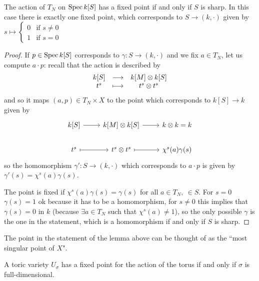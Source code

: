 \begin{lemma}[]\label{LmFixedPointForActionOfTorusInAffine}
The action of $T_N$ on $\operatorname{Spec} k[S]$ has a fixed point if and only if $S$ is sharp.
In this case there is exactly one fixed point, which corresponds to $S\to (k,\cdot)$ given by $s\mapsto \begin{cases}
	0&\text{if }s\neq 0\\
	1&\text{if }s=0
\end{cases}$
\end{lemma}
\begin{proof}
If $p\in \operatorname{Spec} k[S]$ corresponds to $\gamma:S\to (k,\cdot)$ and we fix $a\in T_N$, let us compute $a\cdot p$: recall that the action is described by
\[\begin{array}{ccc} {k[S]} & \longrightarrow & {k[M]\otimes k[S]}\\ {t^s} & \longmapsto & {t^s\otimes t^s} \end{array}\]
and so it maps $(a,p)\in T_N\times X$ to the point which corresponds to $k[S]\to k$ given by
\[\begin{tikzcd}
	{k[S]} & {k[M]\otimes k[S]} & {k\otimes k=k} \\
	{t^s} & {t^s\otimes t^s} & {\chi^s(a)\gamma(s)}
	\arrow[from=1-1, to=1-2]
	\arrow[from=1-2, to=1-3]
	\arrow[maps to, from=2-1, to=2-2]
	\arrow[maps to, from=2-2, to=2-3]
\end{tikzcd}\]
so the homomorphism $\gamma':S\to (k,\cdot)$ which corresponds to $a\cdot p$ is given by $\gamma'(s)=\chi^s(a)\gamma(s)$.

The point is fixed if $\chi^s(a)\gamma(s)=\gamma(s)$ for all $a\in T_N,\ \in S$. For $s= 0$ $\gamma(s)=1$ ok because it has to be a homomorphism, for $s\neq 0$ this implies that $\gamma(s)=0$ in $k$ (because $\exists a\in T_N$ such that $\chi^s(a)\neq 1$), so the only possible $\gamma$ is the one in the statement, which is a homomorphism if and only if $S$ is sharp.
\end{proof}

\begin{remark}
The point in the statement of the lemma above can be thought of as the ``most singular point of $X$".
\end{remark}	

\begin{remark}
A toric variety $U_\sigma$ has a fixed point for the action of the torus if and only if $\sigma$ is full-dimensional.
\end{remark}

